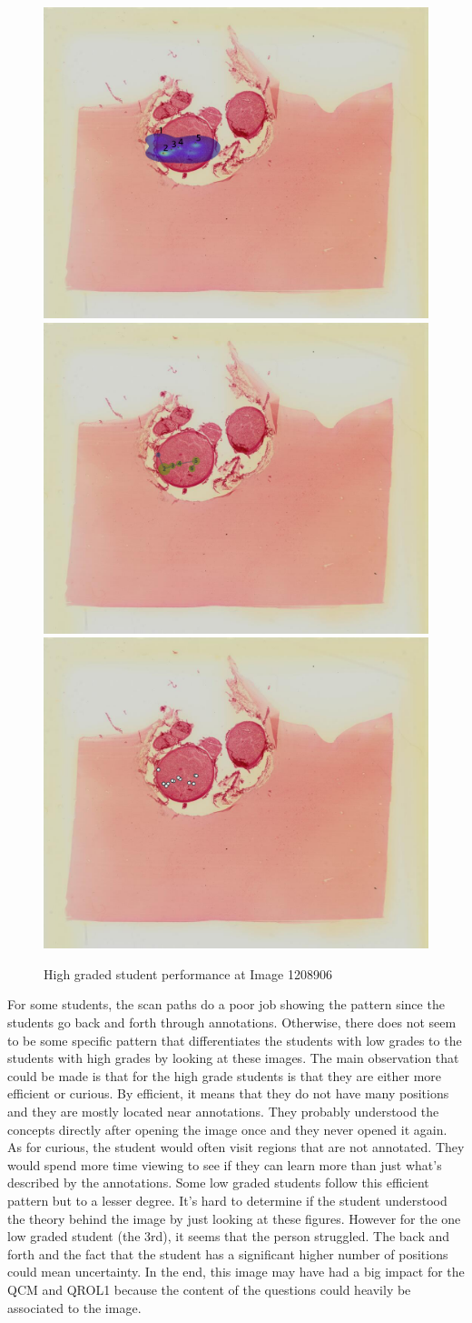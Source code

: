 \documentclass[a4paper,11pt]{report}
\numberwithin{figure}{chapter} %
\begin{document}
\begin{figure}[H]
      \includegraphics[width=.30\linewidth]{images/1942114_heatmap.png}
      \includegraphics[width=.30\linewidth]{images/1942114_scanpath.png}
      \includegraphics[width=.30\linewidth]{images/1942114_points.png} \\


      \caption{High graded student performance at Image 1208906}
      \label{fig:students2}
    \end{figure}

    For some students, the scan paths do a poor job showing the pattern since the students go back and forth through annotations.
    Otherwise, there does not seem to be some specific pattern that differentiates the students with low grades to the students with high grades by looking at these images.
    The main observation that could be made is that for the high grade students is that they are either more efficient or curious.
    By efficient, it means that they do not have many positions and they are mostly located near annotations.
    They probably understood the concepts directly after opening the image once and they never opened it again.
    As for curious, the student would often visit regions  that are not annotated.
    They would spend more time viewing to see if they can learn more than just what's described by the annotations.
    Some low graded students follow this efficient pattern but to a lesser degree.
    It's hard to determine if the student understood the theory behind the image by just looking at these figures.
    However for the one low graded student (the 3rd),  it seems that the person struggled.
    The back and forth and the fact that the student has a significant higher number of positions could mean uncertainty.
    In the end, this image may have had a big impact for the QCM and QROL1 because the content of the questions could heavily be associated to the image.
\end{document}
